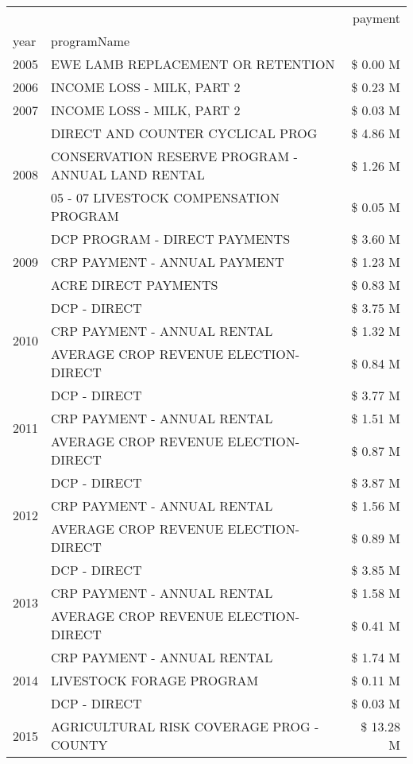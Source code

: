 \begin{tabular}{llr}
\toprule
 &  & payment \\
year & programName &  \\
\midrule
2005 & EWE LAMB REPLACEMENT OR RETENTION & \$ 0.00 M \\
\cline{1-3}
2006 & INCOME LOSS - MILK, PART 2 & \$ 0.23 M \\
\cline{1-3}
2007 & INCOME LOSS - MILK, PART 2 & \$ 0.03 M \\
\cline{1-3}
\multirow[t]{3}{*}{2008} & DIRECT AND COUNTER CYCLICAL PROG & \$ 4.86 M \\
 & CONSERVATION RESERVE PROGRAM - ANNUAL LAND RENTAL & \$ 1.26 M \\
 & 05 - 07 LIVESTOCK COMPENSATION PROGRAM & \$ 0.05 M \\
\cline{1-3}
\multirow[t]{3}{*}{2009} & DCP PROGRAM - DIRECT PAYMENTS & \$ 3.60 M \\
 & CRP PAYMENT - ANNUAL PAYMENT & \$ 1.23 M \\
 & ACRE DIRECT PAYMENTS & \$ 0.83 M \\
\cline{1-3}
\multirow[t]{3}{*}{2010} & DCP - DIRECT & \$ 3.75 M \\
 & CRP PAYMENT - ANNUAL RENTAL & \$ 1.32 M \\
 & AVERAGE CROP REVENUE ELECTION-DIRECT & \$ 0.84 M \\
\cline{1-3}
\multirow[t]{3}{*}{2011} & DCP - DIRECT & \$ 3.77 M \\
 & CRP PAYMENT - ANNUAL RENTAL & \$ 1.51 M \\
 & AVERAGE CROP REVENUE ELECTION-DIRECT & \$ 0.87 M \\
\cline{1-3}
\multirow[t]{3}{*}{2012} & DCP - DIRECT & \$ 3.87 M \\
 & CRP PAYMENT - ANNUAL RENTAL & \$ 1.56 M \\
 & AVERAGE CROP REVENUE ELECTION-DIRECT & \$ 0.89 M \\
\cline{1-3}
\multirow[t]{3}{*}{2013} & DCP - DIRECT & \$ 3.85 M \\
 & CRP PAYMENT - ANNUAL RENTAL & \$ 1.58 M \\
 & AVERAGE CROP REVENUE ELECTION-DIRECT & \$ 0.41 M \\
\cline{1-3}
\multirow[t]{3}{*}{2014} & CRP PAYMENT - ANNUAL RENTAL & \$ 1.74 M \\
 & LIVESTOCK FORAGE PROGRAM & \$ 0.11 M \\
 & DCP - DIRECT & \$ 0.03 M \\
\cline{1-3}
\multirow[t]{3}{*}{2015} & AGRICULTURAL RISK COVERAGE PROG - COUNTY & \$ 13.28 M \\

\end{tabular}
